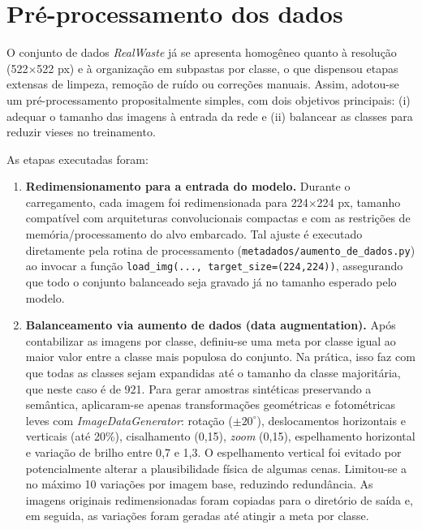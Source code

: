 \documentclass[repeatfields,xlists,xpacks,oneside]{ufrgscca}
\begin{document}
\section{Pré-processamento dos dados}
\label{sec:preprocessamento}

O conjunto de dados \textit{RealWaste} já se apresenta homogêneo quanto à resolução (522\(\times\)522 px) e à organização em subpastas por classe, o que dispensou etapas extensas de limpeza, remoção de ruído ou correções manuais. Assim, adotou-se um pré-processamento propositalmente simples, com dois objetivos principais: (i) adequar o tamanho das imagens à entrada da rede e (ii) balancear as classes para reduzir vieses no treinamento.

As etapas executadas foram:

\begin{enumerate}
    \item \textbf{Redimensionamento para a entrada do modelo.} Durante o carregamento, cada imagem foi redimensionada para 224\(\times\)224 px, tamanho compatível com arquiteturas convolucionais compactas e com as restrições de memória/processamento do alvo embarcado. Tal ajuste é executado diretamente pela rotina de processamento (\texttt{metadados/aumento\_de\_dados.py}) ao invocar a função \texttt{load\_img(..., target\_size=(224,224))}, assegurando que todo o conjunto balanceado seja gravado já no tamanho esperado pelo modelo.

    \item \textbf{Balanceamento via aumento de dados (data augmentation).} Após contabilizar as imagens por classe, definiu-se uma meta por classe igual ao maior valor entre a classe mais populosa do conjunto. Na prática, isso faz com que todas as classes sejam expandidas até o tamanho da classe majoritária, que neste caso é de 921. Para gerar amostras sintéticas preservando a semântica, aplicaram-se apenas transformações geométricas e fotométricas leves com \textit{ImageDataGenerator}: rotação (\(\pm 20^{\circ}\)), deslocamentos horizontais e verticais (até 20\%), cisalhamento (0{,}15), \textit{zoom} (0{,}15), espelhamento horizontal e variação de brilho entre 0{,}7 e 1{,}3. O espelhamento vertical foi evitado por potencialmente alterar a plausibilidade física de algumas cenas. Limitou-se a no máximo 10 variações por imagem base, reduzindo redundância. As imagens originais redimensionadas foram copiadas para o diretório de saída e, em seguida, as variações foram geradas até atingir a meta por classe.
\end{enumerate}
\end{document}
